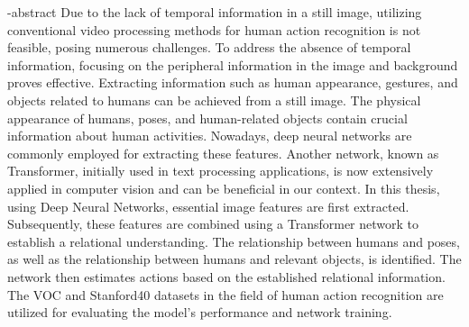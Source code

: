 
\en-abstract{
Due to the lack of temporal information in a still image, utilizing conventional video processing methods for human action recognition is not feasible, posing numerous challenges. To address the absence of temporal information, focusing on the peripheral information in the image and background proves effective. Extracting information such as human appearance, gestures, and objects related to humans can be achieved from a still image. The physical appearance of humans, poses, and human-related objects contain crucial information about human activities. Nowadays, deep neural networks are commonly employed for extracting these features. Another network, known as Transformer, initially used in text processing applications, is now extensively applied in computer vision and can be beneficial in our context. In this thesis, using Deep Neural Networks, essential image features are first extracted. Subsequently, these features are combined using a Transformer network to establish a relational understanding. The relationship between humans and poses, as well as the relationship between humans and relevant objects, is identified. The network then estimates actions based on the established relational information. The VOC and Stanford40 datasets in the field of human action recognition are utilized for evaluating the model's performance and network training.
}
